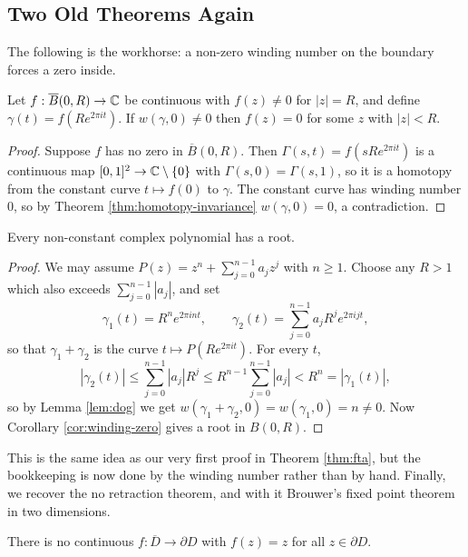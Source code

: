 \documentclass[a4paper]{scrartcl}
\newcommand{\dbar}{\overline{D}}
\begin{document}
\subsection{Two Old Theorems Again}

The following is the workhorse: a non-zero winding number on the boundary forces a zero inside.

\begin{corollary}\label{cor:winding-zero}
	Let $f : \overline{B}(0,R)\to\mathbb{C}$ be continuous with $f(z)\neq0$ for $|z|=R$, and define $\gamma(t) = f(Re^{2\pi it})$. If $w(\gamma,0)\neq0$ then $f(z)=0$ for some $z$ with $|z|<R$.
\end{corollary}

\begin{proof}
	Suppose $f$ has no zero in $\overline B(0,R)$. Then $\Gamma(s,t) = f(sRe^{2\pi it})$ is a continuous map $[0,1]^2\to\mathbb{C}\setminus\{0\}$ with $\Gamma(s,0)=\Gamma(s,1)$, so it is a homotopy from the constant curve $t\mapsto f(0)$ to $\gamma$. The constant curve has winding number $0$, so by Theorem \ref{thm:homotopy-invariance} $w(\gamma,0)=0$, a contradiction.
\end{proof}

\begin{theorem}
	Every non-constant complex polynomial has a root.
\end{theorem}

\begin{proof}
	We may assume $P(z) = z^n + \sum_{j=0}^{n-1}a_jz^j$ with $n\geq1$. Choose any $R>1$ which also exceeds $\sum_{j=0}^{n-1}|a_j|$, and set
	$$\gamma_1(t) = R^ne^{2\pi int}, \qquad \gamma_2(t) = \sum_{j=0}^{n-1}a_jR^je^{2\pi ijt},$$
	so that $\gamma_1+\gamma_2$ is the curve $t\mapsto P(Re^{2\pi it})$. For every $t$,
	$$|\gamma_2(t)|\leq\sum_{j=0}^{n-1}|a_j|R^j \leq R^{n-1}\sum_{j=0}^{n-1}|a_j| < R^n = |\gamma_1(t)|,$$
	so by Lemma \ref{lem:dog} we get $w(\gamma_1+\gamma_2,0)=w(\gamma_1,0)=n\neq0$. Now Corollary \ref{cor:winding-zero} gives a root in $B(0,R)$.
\end{proof}

This is the same idea as our very first proof in Theorem \ref{thm:fta}, but the bookkeeping is now done by the winding number rather than by hand. Finally, we recover the no retraction theorem, and with it Brouwer's fixed point theorem in two dimensions.

\begin{theorem}
	There is no continuous $f : \dbar\to\partial D$ with $f(z)=z$ for all $z\in\partial D$.
\end{theorem}
\end{document}
